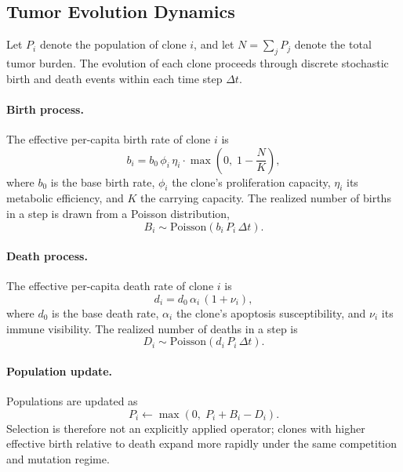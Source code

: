 \documentclass[12pt,a4paper]{article}
\begin{document}
\subsection{Tumor Evolution Dynamics}

Let $P_i$ denote the population of clone $i$, and let $N = \sum_j P_j$ denote the total tumor burden. The evolution of each clone proceeds through discrete stochastic birth and death events within each time step $\Delta t$.

\paragraph{Birth process.}
The effective per-capita birth rate of clone $i$ is
\begin{equation}
b_i = b_0 \, \phi_i \, \eta_i \cdot \max\!\left(0, \; 1 - \frac{N}{K}\right),
\end{equation}
where $b_0$ is the base birth rate, $\phi_i$ the clone's proliferation capacity, $\eta_i$ its metabolic efficiency, and $K$ the carrying capacity. The realized number of births in a step is drawn from a Poisson distribution,
\begin{equation}
B_i \sim \mathrm{Poisson}\!\left(b_i \, P_i \, \Delta t\right).
\end{equation}

\paragraph{Death process.}
The effective per-capita death rate of clone $i$ is
\begin{equation}
d_i = d_0 \, \alpha_i \,(1 + \nu_i),
\end{equation}
where $d_0$ is the base death rate, $\alpha_i$ the clone's apoptosis susceptibility, and $\nu_i$ its immune visibility. The realized number of deaths in a step is
\begin{equation}
D_i \sim \mathrm{Poisson}\!\left(d_i \, P_i \, \Delta t\right).
\end{equation}

\paragraph{Population update.}
Populations are updated as
\begin{equation}
P_i \leftarrow \max\!\left(0, \; P_i + B_i - D_i\right).
\end{equation}
Selection is therefore not an explicitly applied operator; clones with higher effective birth relative to death expand more rapidly under the same competition and mutation regime.
\end{document}
